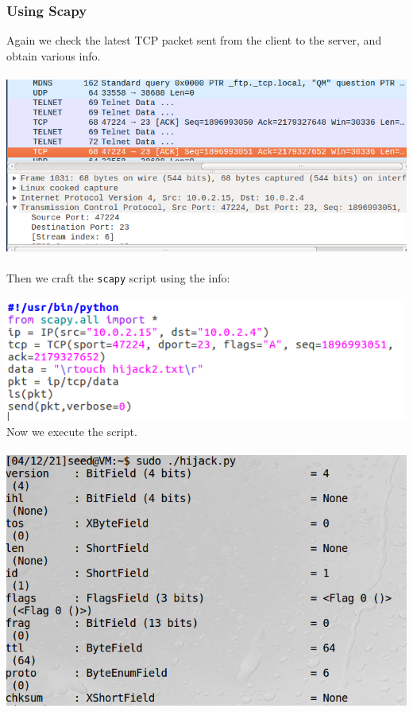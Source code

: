 \documentclass[a4paper]{article}
\begin{document}
\subsubsection{Using Scapy}
Again we check the latest TCP packet sent from the client to the server, and obtain various info.\\\\
\includegraphics[scale=0.7]{1/28.png}\\\\
Then we craft the \verb+scapy+ script using the info:\\\\
\pagebreak
\includegraphics[scale=0.7]{1/29.png}
\\Now we execute the script.\\\\
\includegraphics[scale=0.7]{1/30.png}\\\\
\end{document}
